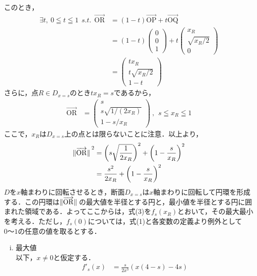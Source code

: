 \documentclass[a4j,dvipdfmx]{jarticle}%
\begin{document}
{このとき，
\begin{align}
    \exists t,~0\leqq t\leqq 1~~ s.t.~~ \overrightarrow{\mathrm{OR}} &= (1-t)\overrightarrow{\mathrm{OP}} + t\overrightarrow{\mathrm{OQ}} \nonumber \\
    &= (1-t)\begin{pmatrix}
    0 \\ 0 \\ 1
    \end{pmatrix} + t\begin{pmatrix}
    x_R \\ \sqrt{x_R/2} \\ 0
    \end{pmatrix} \nonumber \\
    &= \begin{pmatrix}
    tx_R \\ t\sqrt{x_R/2} \\ 1-t
    \end{pmatrix} 
\end{align}
さらに，点$R\in D_{x=s}$のとき$tx_R=s$であるから，
\begin{align}
    \overrightarrow{\mathrm{OR}} &= \begin{pmatrix}
    s \\ s\sqrt{1/(2x_R)}\\ 1-s/x_R
    \end{pmatrix} ~,~~s \leqq x_R\leqq 1
\end{align}
ここで，$x_R$は$D_{x=s}$上の点とは限らないことに注意．以上より，
\begin{align}
    \norm*{\overrightarrow{\mathrm{OR}}}^2 &= \left(s\sqrt{\frac{1}{2x_R}}\right)^2 + \left(1-\frac{s}{x_R}\right)^2 \nonumber \\
    &=\frac{s^2}{2x_R} + \left(1-\frac{s}{x_R}\right)^2 
\end{align}
$D$を$x$軸まわりに回転させるとき，断面$D_{x=s}$は$x$軸まわりに回転して円環を形成する．この円環は$\norm*{\overrightarrow{\mathrm{OR}}}$の最大値を半径とする円と，最小値を半径とする円に囲まれた領域である．よってここからは，式(3)を$f_s(x_R)$とおいて，その最大最小を考える．ただし，$f_s(0)$については，式(1)と各変数の定義より例外として$0～1$の任意の値を取るとする．
\begin{enumerate}[i)]
    \item 最大値\\
    以下，$x\neq 0$と仮定する．
\begin{align}
    f'_s(x) &= \frac{s}{2x^3}\left(x(4-s)-4s\right) 
\end{align}

\end{enumerate}}
\end{document}
